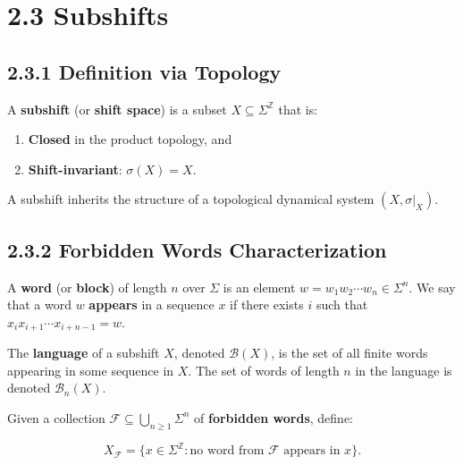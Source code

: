 \section{2.3 Subshifts}

\subsection{2.3.1 Definition via Topology}

\begin{definition}[Subshift]
A \textbf{subshift} (or \textbf{shift space}) is a subset $X \subseteq \Sigma^{\mathbb{Z}}$ that is:
\end{definition}

\begin{enumerate}
  \item \textbf{Closed} in the product topology, and
  \item \textbf{Shift-invariant}: $\sigma(X) = X$.
\end{enumerate}

A subshift inherits the structure of a topological dynamical system $(X, \sigma|_X)$.

\subsection{2.3.2 Forbidden Words Characterization}

A \textbf{word} (or \textbf{block}) of length $n$ over $\Sigma$ is an element $w = w_1 w_2 \cdots w_n \in \Sigma^n$. We say that a word $w$ \textbf{appears} in a sequence $x$ if there exists $i$ such that $x_i x_{i+1} \cdots x_{i+n-1} = w$.

\begin{definition}[Language]
The \textbf{language} of a subshift $X$, denoted $\mathcal{B}(X)$, is the set of all finite words appearing in some sequence in $X$. The set of words of length $n$ in the language is denoted $\mathcal{B}_n(X)$.

Given a collection $\mathcal{F} \subseteq \bigcup_{n \geq 1} \Sigma^n$ of \textbf{forbidden words}, define:

\[
X_{\mathcal{F}} = \{ x \in \Sigma^{\mathbb{Z}} : \text{no word from } \mathcal{F} \text{ appears in } x \} .
\]
\end{definition}

